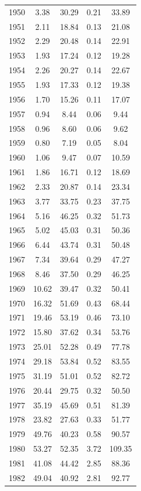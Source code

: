 \documentclass[12pt,]{article}
\begin{document}
\begin{longtable}{ccccc}
  1950 & 3.38 & 30.29 & 0.21 & 33.89 \\ 
  1951 & 2.11 & 18.84 & 0.13 & 21.08 \\ 
  1952 & 2.29 & 20.48 & 0.14 & 22.91 \\ 
  1953 & 1.93 & 17.24 & 0.12 & 19.28 \\ 
  1954 & 2.26 & 20.27 & 0.14 & 22.67 \\ 
  1955 & 1.93 & 17.33 & 0.12 & 19.38 \\ 
  1956 & 1.70 & 15.26 & 0.11 & 17.07 \\ 
  1957 & 0.94 & 8.44 & 0.06 & 9.44 \\ 
  1958 & 0.96 & 8.60 & 0.06 & 9.62 \\ 
  1959 & 0.80 & 7.19 & 0.05 & 8.04 \\ 
  1960 & 1.06 & 9.47 & 0.07 & 10.59 \\ 
  1961 & 1.86 & 16.71 & 0.12 & 18.69 \\ 
  1962 & 2.33 & 20.87 & 0.14 & 23.34 \\ 
  1963 & 3.77 & 33.75 & 0.23 & 37.75 \\ 
  1964 & 5.16 & 46.25 & 0.32 & 51.73 \\ 
  1965 & 5.02 & 45.03 & 0.31 & 50.36 \\ 
  1966 & 6.44 & 43.74 & 0.31 & 50.48 \\ 
  1967 & 7.34 & 39.64 & 0.29 & 47.27 \\ 
  1968 & 8.46 & 37.50 & 0.29 & 46.25 \\ 
  1969 & 10.62 & 39.47 & 0.32 & 50.41 \\ 
  1970 & 16.32 & 51.69 & 0.43 & 68.44 \\ 
  1971 & 19.46 & 53.19 & 0.46 & 73.10 \\ 
  1972 & 15.80 & 37.62 & 0.34 & 53.76 \\ 
  1973 & 25.01 & 52.28 & 0.49 & 77.78 \\ 
  1974 & 29.18 & 53.84 & 0.52 & 83.55 \\ 
  1975 & 31.19 & 51.01 & 0.52 & 82.72 \\ 
  1976 & 20.44 & 29.75 & 0.32 & 50.50 \\ 
  1977 & 35.19 & 45.69 & 0.51 & 81.39 \\ 
  1978 & 23.82 & 27.63 & 0.33 & 51.77 \\ 
  1979 & 49.76 & 40.23 & 0.58 & 90.57 \\ 
  1980 & 53.27 & 52.35 & 3.72 & 109.35 \\ 
  1981 & 41.08 & 44.42 & 2.85 & 88.36 \\ 
  1982 & 49.04 & 40.92 & 2.81 & 92.77 \\ 

\end{longtable}
\end{document}
